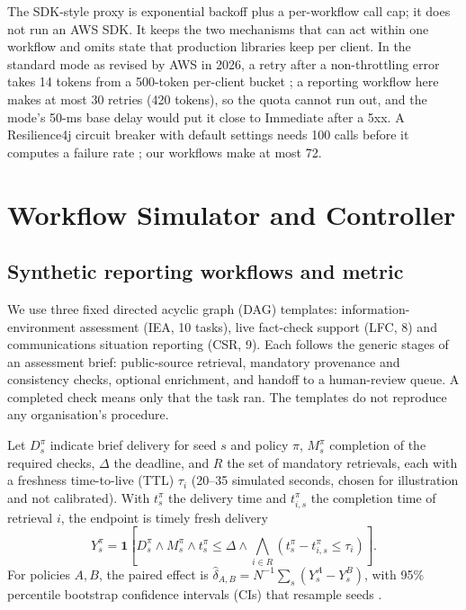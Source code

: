 \documentclass[conference,a4paper]{IEEEtran}
\begin{document}
The SDK-style proxy is exponential backoff plus a per-workflow call cap; it does not run an AWS SDK. It keeps the two mechanisms that can act within one workflow and omits state that production libraries keep per client. In the standard mode as revised by AWS in 2026, a retry after a non-throttling error takes 14 tokens from a 500-token per-client bucket \cite{awsretry}; a reporting workflow here makes at most 30 retries (420 tokens), so the quota cannot run out, and the mode's 50-ms base delay would put it close to Immediate after a 5xx. A Resilience4j circuit breaker with default settings needs 100 calls before it computes a failure rate \cite{resilience4j}; our workflows make at most 72.

\section{Workflow Simulator and Controller}\label{sec:sim}
\subsection{Synthetic reporting workflows and metric}
We use three fixed directed acyclic graph (DAG) templates: information-environment assessment (IEA, 10 tasks), live fact-check support (LFC, 8) and communications situation reporting (CSR, 9). Each follows the generic stages of an assessment brief: public-source retrieval, mandatory provenance and consistency checks, optional enrichment, and handoff to a human-review queue. A completed check means only that the task ran. The templates do not reproduce any organisation's procedure.

Let $D_s^\pi$ indicate brief delivery for seed $s$ and policy $\pi$, $M_s^\pi$ completion of the required checks, $\Delta$ the deadline, and $R$ the set of mandatory retrievals, each with a freshness time-to-live (TTL) $\tau_i$ (20--35 simulated seconds, chosen for illustration and not calibrated). With $t_s^\pi$ the delivery time and $t_{i,s}^\pi$ the completion time of retrieval $i$, the endpoint is timely fresh delivery
\begin{equation}\label{eq:metric}
Y_s^\pi=\mathbf{1}\!\left[D_s^\pi\land M_s^\pi\land t_s^\pi\le\Delta\land\bigwedge_{i\in R}(t_s^\pi-t_{i,s}^\pi\le\tau_i)\right].
\end{equation}
For policies $A,B$, the paired effect is $\widehat\delta_{A,B}=N^{-1}\sum_s(Y_s^A-Y_s^B)$, with 95\% percentile bootstrap confidence intervals (CIs) that resample seeds \cite{efron}.
\end{document}
